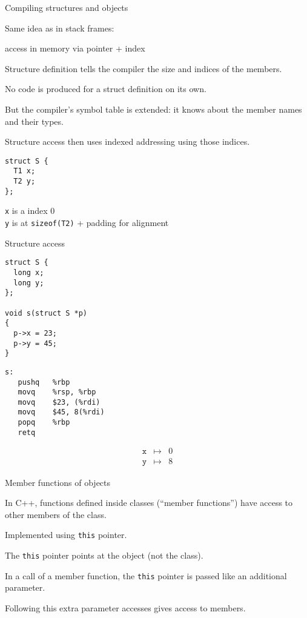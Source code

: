 \documentclass[landscape]{beamer}
\begin{document}
\begin{frame}[fragile]{Compiling structures and objects}

Same idea as in stack frames:

access in memory via
pointer + index

Structure \alert{definition} tells the compiler the size and indices of the members.

No code is produced for a struct definition on its own. 

But the compiler's symbol table is extended: it knows about the member names and their types.

Structure \alert{access} then uses indexed addressing using those indices.

\begin{verbatim}
struct S {
  T1 x;
  T2 y;
};
\end{verbatim}
\pause
\texttt x is a index 0\\
 \texttt y is at \texttt{sizeof(T2)} + padding for alignment
\end{frame}

\begin{frame}[fragile]{Structure access}
\begin{minipage}{.5\textwidth}
\begin{verbatim}
struct S {
  long x;
  long y;
};

void s(struct S *p)
{
  p->x = 23;
  p->y = 45;
}
\end{verbatim}
\end{minipage}
%
\begin{minipage}{.45\textwidth}
\begin{verbatim}
s:      
   pushq   %rbp
   movq    %rsp, %rbp
   movq    $23, (%rdi)
   movq    $45, 8(%rdi)
   popq    %rbp
   retq
\end{verbatim}
\end{minipage}
\begin{eqnarray*}
\texttt x&\mapsto& 0
\\
\texttt y&\mapsto& 8
\end{eqnarray*}
\end{frame}


\begin{frame}{Member functions of objects}

In C++, functions defined inside classes (``member functions'') have access to other members of the class.

Implemented using \texttt{this} pointer.

The \texttt{this} pointer points at the object (not the class).

In a call of a member function, the \texttt{this} pointer is passed like an additional parameter.

Following this extra parameter accesses gives access to members.

\end{frame}
\end{document}
